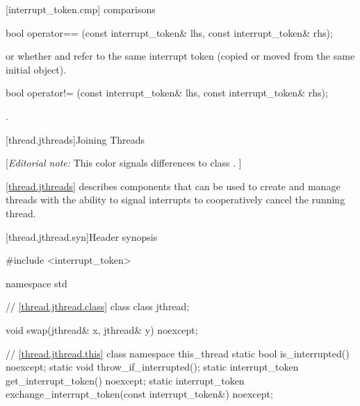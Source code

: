 {%
[interrupt_token.cmp]{ comparisons}

%
\begin{itemdecl}
bool operator== (const interrupt_token& lhs, const interrupt_token& rhs);
\end{itemdecl}
\begin{itemdescr}
  \pnum\returns {} or
                whether  and  refer to the
                same interrupt token
                (copied or moved from the same initial object).
\end{itemdescr}

%
\begin{itemdecl}
bool operator!= (const interrupt_token& lhs, const interrupt_token& rhs);
\end{itemdecl}
\begin{itemdescr}
  \pnum\returns {}.
\end{itemdescr}


\clearpage

[thread.jthreads]{Joining Threads}

{\color{blue}
[{\itshape{}Editorial note:} {\color{diffcolor}This color signals differences to class .} ]
}


\pnum
\ref{thread.jthreads} describes components that can be used to create and manage threads
with the ability to signal interrupts to cooperatively cancel the running thread.

[thread.jthread.syn]{Header  synopsis}
%

\begin{codeblock}
#include <interrupt_token>

namespace std {
  // \ref{thread.jthread.class} class 
  class jthread;

  void swap(jthread& x, jthread& y) noexcept;

  // \ref{thread.jthread.this} class 
  namespace this_thread {
    static bool is_interrupted() noexcept;
    static void throw_if_interrupted();
    static interrupt_token get_interrupt_token() noexcept;
    static interrupt_token exchange_interrupt_token(const interrupt_token&) noexcept;
  }
}
\end{codeblock}

}
